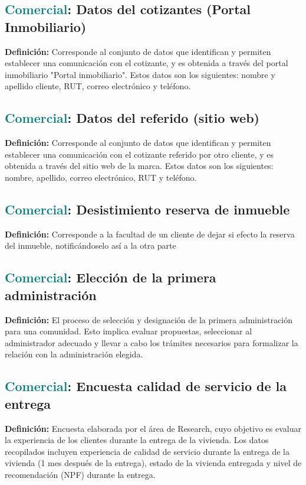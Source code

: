 \documentclass[12pt]{article}
\begin{document}
\subsection{\textcolor{teal}{Comercial}: Datos del cotizantes (Portal Inmobiliario)}
\textbf{Definición:} Corresponde al conjunto de datos que identifican y permiten establecer una comunicación con el cotizante, y es obtenida a través del portal inmobiliario "Portal inmobiliario". Estos datos son los siguientes: nombre y apellido cliente, RUT, correo electrónico y teléfono.
\subsection{\textcolor{teal}{Comercial}: Datos del referido (sitio web)}
\textbf{Definición:} Corresponde al conjunto de datos que identifican y permiten establecer una comunicación con el cotizante referido por otro cliente, y es obtenida a través del sitio web de la marca. Estos datos son los siguientes: nombre, apellido, correo electrónico, RUT y teléfono.
\subsection{\textcolor{teal}{Comercial}: Desistimiento reserva de inmueble}
\textbf{Definición:} Corresponde a la facultad de un cliente de dejar si efecto la reserva del inmueble, notificándoselo así a la otra parte
\subsection{\textcolor{teal}{Comercial}: Elección de la primera administración}
\textbf{Definición:} El proceso de selección y designación de la primera administración para una comunidad. Esto implica evaluar propuestas, seleccionar al administrador adecuado y llevar a cabo los trámites necesarios para formalizar la relación con la administración elegida.
\subsection{\textcolor{teal}{Comercial}: Encuesta calidad de servicio de la entrega}
\textbf{Definición:} Encuesta elaborada por el área de Research, cuyo objetivo es evaluar la experiencia de los clientes durante la entrega de la vivienda. Los datos recopilados incluyen experiencia de calidad de servicio durante la entrega de la vivienda (1 mes después de la entrega), estado de la vivienda entregada y nivel de recomendación (NPF) durante la entrega.
\end{document}
